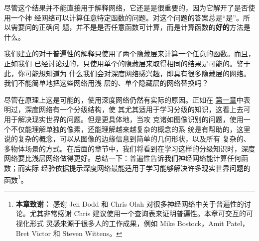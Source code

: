 尽管这个结果并不能直接用于解释网络，它还是是很重要的，因为它解开了是否使用一个神
经网络可以计算任意特定函数的问题。对这个问题的答案总是“是”。所以需要问的正确问
题，并不是是否任意函数可计算，而是计算函数的\textbf{好的}方法是什么。

我们建立的对于普遍性的解释只使用了两个隐藏层来计算一个任意的函数。而且，正如我们
已经讨论过的，只使用单个的隐藏层来取得相同的结果是可能的。鉴于此，你可能想知道为
什么我们会对深度网络感兴趣，即具有很多隐藏层的网络。我们不能简单地把这些网络用浅
层的、单个隐藏层的网络替换吗？

尽管在原理上这是可能的，使用深度网络仍然有实际的原因。正如在%
\hyperref[sec:toward_deep_learning]{第一章}中表明过，深度网络有一个分级结构，使
其尤其适用于学习分级的知识，这看上去可用于解决现实世界的问题。但是更具体地，当攻
克诸如图像识别的问题，使用一个不仅能理解单独的像素，还能理解越来越复杂的概念的系
统是有帮助的，这里说的复杂的概念，可以从图像的边缘信息到简单的几何形状，以及所有
复杂的、多物体场景的方式。在后面的章节中，我们将看到在学习这样的分级知识时，深度
网络要比浅层网络做得更好。总结一下：普遍性告诉我们神经网络能计算任何函数；而实际
经验依据提示深度网络最能适用于学习能够解决许多现实世界问题的函数\footnote{
  \textbf{本章致谢：} 感谢 Jen Dodd 和 Chris Olah 对很多神经网络中关于普遍性的讨
  论。尤其非常感谢 Chris 建议使用一个查询表来证明普遍性。本章可交互的可视化形式
  灵感来源于很多人的工作成果，例如 Mike Bostock，Amit Patel，Bret Victor 和
  Steven Wittens。}。
